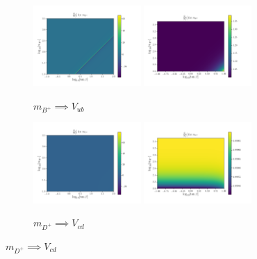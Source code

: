 \documentclass[11pt]{article}
\begin{document}
\begin{figure}[H]
    \centering
    \begin{subfigure}[b]{\textwidth}
        \centering
        \includegraphics[width=0.45\textwidth]{heatmaps/mB-rH0.png}
        \includegraphics[width=0.45\textwidth]{heatmaps/mB-rH1.png}
        \caption{$m_{B^+} \implies V_{ub}$}
    \end{subfigure}
    \begin{subfigure}[b]{\textwidth}
        \centering
        \includegraphics[width=0.45\textwidth]{heatmaps/mD-rH0.png}
        \includegraphics[width=0.45\textwidth]{heatmaps/mD-rH1.png}
        \caption{$m_{D^+} \implies V_{cd}$}
    \end{subfigure}
\end{figure}
\end{document}
